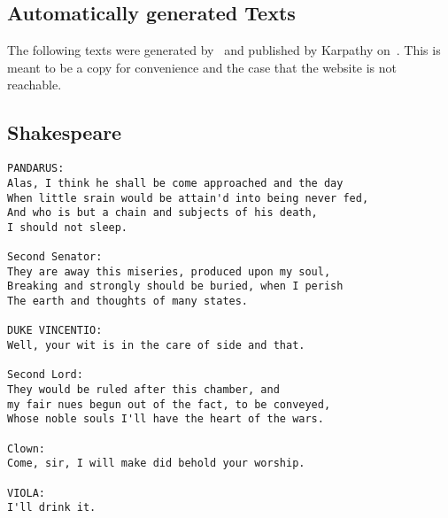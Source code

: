 
\clearpage\onecolumn
\begin{appendices}
\section{Automatically generated Texts}\label{sec:appendix-auto-generated-text}
The following texts were generated by~\cite{charRNNgithub} and published by
Karpathy on~\cite{Karpathy2015}. This is meant to be a copy for convenience
and the case that the website is not reachable.

\subsection{Shakespeare}
\begin{verbatim}
PANDARUS:
Alas, I think he shall be come approached and the day
When little srain would be attain'd into being never fed,
And who is but a chain and subjects of his death,
I should not sleep.

Second Senator:
They are away this miseries, produced upon my soul,
Breaking and strongly should be buried, when I perish
The earth and thoughts of many states.

DUKE VINCENTIO:
Well, your wit is in the care of side and that.

Second Lord:
They would be ruled after this chamber, and
my fair nues begun out of the fact, to be conveyed,
Whose noble souls I'll have the heart of the wars.

Clown:
Come, sir, I will make did behold your worship.

VIOLA:
I'll drink it.
\end{verbatim}

\end{appendices}


